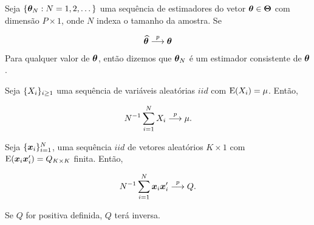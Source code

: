 \documentclass[11pt, oneside, a4paper, article]{article}
\numberwithin{equation}{section}
\begin{document}
\begin{description}
\begin{defn}
	\citet[Def 3.8, p.40 ]{wool-2010}

	Seja $\{\boldsymbol{\theta}_{N}: N=1, 2, \dots\}$ uma sequência de estimadores do vetor $\boldsymbol{\theta} \in \boldsymbol{\Theta}$ com dimensão $P \times 1$, onde $N$ indexa o tamanho da amostra.
	Se

	\vspace{-1 em}
	\begin{align} \label{consist}
		\widehat{\boldsymbol{\theta}} \overset{p}{\longrightarrow} \boldsymbol{\theta}
	\end{align}
	Para qualquer valor de $\boldsymbol{\theta}$, então dizemos que $\boldsymbol{\theta}_{N}$ é um estimador consistente de $\boldsymbol{\theta}$.
\end{defn}

\begin{teo} \label{teo:lgn}

	Seja $\{X_{i}\}_{i \geq 1}$ uma sequência de variáveis aleatórias $iid$ com $\text{E}(X_{i}) = \mu$.
	Então, 

	\vspace{-1 em}
	\begin{align*}
		N^{-1} \sum_{i=1}^{N} X_{i}  \overset{p}{\longrightarrow}  \mu.
	\end{align*}
\end{teo}

\begin{teo} \label{teo:lgn:mat:1}

	Seja $\{\boldsymbol{x}_{i}\}_{i=1}^{N}$, uma sequência $iid$ de vetores aleatórios $K \times 1$ com $\text{E}(\boldsymbol{x}_{i} \boldsymbol{x}_{i}') = Q_{K \times K}$ finita.
	Então, 

	\vspace{-1 em}
	\begin{align*}
		N^{-1} \sum_{i=1}^{N}
		\boldsymbol{x}_{i} \boldsymbol{x}_{i}'
		 \overset{p}{\longrightarrow}  Q.
	\end{align*}

	Se $Q$ for positiva definida, $Q$ terá inversa.
\end{teo}


\end{description}
\end{document}
